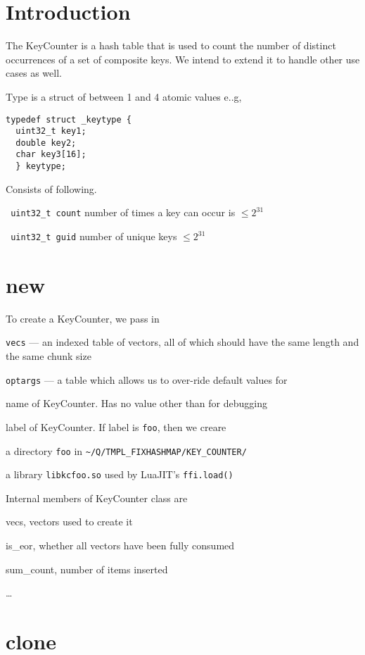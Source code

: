
\section{Introduction}
The KeyCounter is a hash table that is used to count the number of distinct
occurrences of a set of composite keys. We intend to extend it to handle other use cases
as well. 

\bd
\item [Key] Type is a struct of between 1 and 4 atomic values e..g,
\begin{verbatim}
typedef struct _keytype { 
  uint32_t key1;
  double key2;
  char key3[16];
  } keytype;
\end{verbatim}
\item [Value]
Consists of following. 
\be
\item \verb+ uint32_t count+ number of times a key can occur is \(\leq 2^{31}\) 
\item \verb+ uint32_t guid+ number of unique keys \(\leq 2^{31}\) 
\ee
\ed

\section{new}
\label{new}
To create a KeyCounter, we pass in 
\be
\item {\tt vecs} --- an indexed table of vectors, all of which should have the same length and the same chunk size
\item {\tt optargs} --- a table which allows us to over-ride default values for
\be
\item name of KeyCounter. Has no value other than for debugging
\item label of KeyCounter. If label is {\tt foo}, then we creare
\be
\item a directory {\tt foo} in \verb+~/Q/TMPL_FIXHASHMAP/KEY_COUNTER/+
\item a library {\tt libkcfoo.so} used by LuaJIT's {\tt ffi.load()}
\ee
\ee
\ee

Internal members of KeyCounter class are 
\be
\item vecs, vectors used to create it
\item is\_eor, whether all vectors have been fully consumed
\item sum\_count, number of items inserted
\item \ldots
\ee
\section{clone}
\label{clone}

